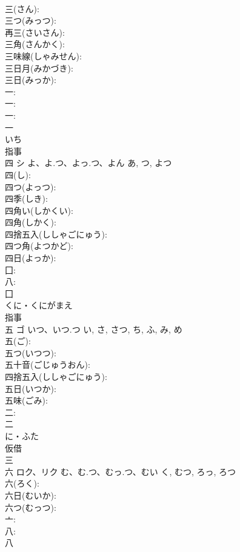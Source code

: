 \documentclass[8pt]{extreport}
\begin{document}
\begin{CJK}{UTF8}{min}
\\	三(さん): 
\\	三つ(みっつ): 
\\	再三(さいさん): 
\\	三角(さんかく): 
\\	三味線(しゃみせん): 
\\	三日月(みかづき): 
\\	三日(みっか): 
\\	一: 
\\	一: 
\\	一: 
\\	一	
\\	いち	
\\	指事 
\\	四	シ	よ、よ.つ、よっ.つ、よん	あ, つ, よつ	
\\	四(し): 
\\	四つ(よっつ): 
\\	四季(しき): 
\\	四角い(しかくい): 
\\	四角(しかく): 
\\	四捨五入(ししゃごにゅう): 
\\	四つ角(よつかど): 
\\	四日(よっか): 
\\	囗: 
\\	八: 
\\	囗	
\\	くに・くにがまえ	
\\	指事 
\\	五	ゴ	いつ、いつ.つ	い, さ, さつ, ち, ふ, み, め	
\\	五(ご): 
\\	五つ(いつつ): 
\\	五十音(ごじゅうおん): 
\\	四捨五入(ししゃごにゅう): 
\\	五日(いつか): 
\\	五味(ごみ): 
\\	二: 
\\	二	
\\	に・ふた	
\\	仮借 
\\	三 
\\	六	ロク、リク	む、む.つ、むっ.つ、むい	く, むつ, ろっ, ろつ	
\\	六(ろく): 
\\	六日(むいか): 
\\	六つ(むっつ): 
\\	亠: 
\\	八: 
\\	八	

\end{CJK}
\end{document}
